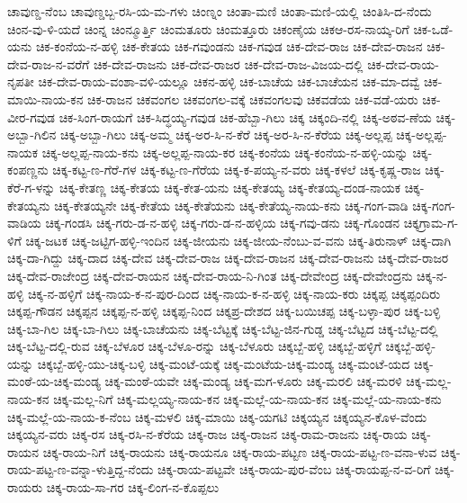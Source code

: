 ಚಾವುಣ್ಡ-ನೆಂಬ
ಚಾವುಣ್ಡಬ್ಬ-ರಸಿ-ಯ-ಮ-ಗಳು
ಚಿಂಣ್ನಂ
ಚಿಂತಾ-ಮಣಿ
ಚಿಂತಾ-ಮಣಿ-ಯಲ್ಲಿ
ಚಿಂತಿಸಿ-ದ-ನೆಂದು
ಚಿಂನ-ವು-ಳಿ-ಯದೆ
ಚಿಂನ್ನ
ಚಿಂನ್ಮೂರ್ತ್ತಿ
ಚಿಂಮತೂರು
ಚಿಂಮತ್ತೂರು
ಚಿಕಂಣೈಯ
ಚಿಕಆ-ರಸ-ನಾಯ್ಕ-ರಿಗೆ
ಚಿಕ-ಒಡೆ-ಯನು
ಚಿಕ-ಕಂನೆಯ-ನ-ಹಳ್ಳಿ
ಚಿಕ-ಕೇತಯ
ಚಿಕ-ಗವುಂಡನು
ಚಿಕ-ಗವುಡ
ಚಿಕ-ದೇವ-ರಾಜ
ಚಿಕ-ದೇವ-ರಾಜನ
ಚಿಕ-ದೇವ-ರಾಜ-ನ-ವರೆಗೆ
ಚಿಕ-ದೇವ-ರಾಜನು
ಚಿಕ-ದೇವ-ರಾಜರ
ಚಿಕ-ದೇವ-ರಾಜ-ವಿಜಯ-ದಲ್ಲಿ
ಚಿಕ-ದೇವ-ರಾಯ-ನೃಪತೀ
ಚಿಕ-ದೇವ-ರಾಯ-ವಂಶಾ-ವಳಿ-ಯಲ್ಲೂ
ಚಿಕನ-ಹಳ್ಳಿ
ಚಿಕ-ಬಾಚೆಯ
ಚಿಕ-ಬಾಚೆಯನ
ಚಿಕ-ಮಾ-ದವ್ವೆ
ಚಿಕ-ಮಾಯಿ-ನಾಯ-ಕನ
ಚಿಕ-ರಾಜನ
ಚಿಕವಂಗಲ
ಚಿಕವಂಗಲ-ವಕ್ಕೆ
ಚಿಕವಂಗಲವು
ಚಿಕವಡೆಯ
ಚಿಕ-ವಡೆ-ಯರು
ಚಿಕ-ವೀರ-ಗವುಡ
ಚಿಕ-ಸಿಂಗ-ರಾಯಗೆ
ಚಿಕ-ಸಿದ್ಧಯ್ಯ-ಗವುಡ
ಚಿಕ-ಹೆಬ್ಬಾ-ಗಿಲು
ಚಿಕ್ಕ
ಚಿಕ್ಕಂದಿ-ನಲ್ಲಿ
ಚಿಕ್ಕ-ಅಠವ-ಣೆಯ
ಚಿಕ್ಕ-ಅಬ್ಬಾ-ಗಿಲಿನ
ಚಿಕ್ಕ-ಅಬ್ಬಾ-ಗಿಲು
ಚಿಕ್ಕ-ಅಮ್ಮ
ಚಿಕ್ಕ-ಅರ-ಸಿ-ನ-ಕೆರೆ
ಚಿಕ್ಕ-ಅರ-ಸಿ-ನ-ಕೆರೆಯ
ಚಿಕ್ಕ-ಅಲ್ಲಪ್ಪ
ಚಿಕ್ಕ-ಅಲ್ಲಪ್ಪ-ನಾಯಕ
ಚಿಕ್ಕ-ಅಲ್ಲಪ್ಪ-ನಾಯ-ಕನು
ಚಿಕ್ಕ-ಅಲ್ಲಪ್ಪ-ನಾಯ-ಕರ
ಚಿಕ್ಕ-ಕಂನೆಯ
ಚಿಕ್ಕ-ಕಂನೆಯ-ನ-ಹಳ್ಳಿ-ಯನ್ನು
ಚಿಕ್ಕ-ಕಂಪಣ್ಣನು
ಚಿಕ್ಕ-ಕಟ್ಟ-ಣ-ಗೆರೆ-ಗಳ
ಚಿಕ್ಕ-ಕಟ್ಟ-ಣ-ಗೆರೆಯ
ಚಿಕ್ಕ-ಕ-ಪಯ್ಯ-ನ-ವರು
ಚಿಕ್ಕ-ಕಳಲೆ
ಚಿಕ್ಕ-ಕೃಷ್ಣ-ರಾಜ
ಚಿಕ್ಕ-ಕೆರೆ-ಗ-ಳನ್ನು
ಚಿಕ್ಕ-ಕೇತಣ್ಣ
ಚಿಕ್ಕ-ಕೇತಯ
ಚಿಕ್ಕ-ಕೇತ-ಯನು
ಚಿಕ್ಕ-ಕೇತಯ್ಯ
ಚಿಕ್ಕ-ಕೇತಯ್ಯ-ದಂಡ-ನಾಯಕ
ಚಿಕ್ಕ-ಕೇತಯ್ಯನು
ಚಿಕ್ಕ-ಕೇತಯ್ಯನೇ
ಚಿಕ್ಕ-ಕೇತೆಯ
ಚಿಕ್ಕ-ಕೇತೆಯನು
ಚಿಕ್ಕ-ಕೇತೆಯ್ಯ-ನಾಯ-ಕನು
ಚಿಕ್ಕ-ಗಂಗ-ವಾಡಿ
ಚಿಕ್ಕ-ಗಂಗ-ವಾಡಿಯ
ಚಿಕ್ಕ-ಗಂಡಸಿ
ಚಿಕ್ಕ-ಗರು-ಡ-ನ-ಹಳ್ಳಿ
ಚಿಕ್ಕ-ಗರು-ಡ-ನ-ಹಳ್ಳಿಯ
ಚಿಕ್ಕ-ಗವು-ಡನು
ಚಿಕ್ಕ-ಗೊಂಡನ
ಚಿಕ್ಕಗ್ರಾಮ-ಗ-ಳಿಗೆ
ಚಿಕ್ಕ-ಜಟಕ
ಚಿಕ್ಕ-ಜಟ್ಟಿಗ-ಹಳ್ಳಿ-ಇಂದಿನ
ಚಿಕ್ಕ-ಜೀಯನು
ಚಿಕ್ಕ-ಜೀಯ-ನೆಂಬು-ವ-ವನು
ಚಿಕ್ಕ-ತಿರುನಾಳ್
ಚಿಕ್ಕ-ದಾಗಿ
ಚಿಕ್ಕ-ದಾ-ಗಿದ್ದು
ಚಿಕ್ಕ-ದಾದ
ಚಿಕ್ಕ-ದೇವ
ಚಿಕ್ಕ-ದೇವ-ರಾಜ
ಚಿಕ್ಕ-ದೇವ-ರಾಜನ
ಚಿಕ್ಕ-ದೇವ-ರಾಜನು
ಚಿಕ್ಕ-ದೇವ-ರಾಜರ
ಚಿಕ್ಕ-ದೇವ-ರಾಜೇಂದ್ರ
ಚಿಕ್ಕ-ದೇವ-ರಾಯನ
ಚಿಕ್ಕ-ದೇವ-ರಾಯ-ನಿ-ಗಿಂತ
ಚಿಕ್ಕ-ದೇವೇಂದ್ರ
ಚಿಕ್ಕ-ದೇವೇಂದ್ರನು
ಚಿಕ್ಕ-ನ-ಹಳ್ಳಿ
ಚಿಕ್ಕ-ನ-ಹಳ್ಳಿಗೆ
ಚಿಕ್ಕ-ನಾಯ-ಕ-ನ-ಪುರ-ದಿಂದ
ಚಿಕ್ಕ-ನಾಯ-ಕ-ನ-ಹಳ್ಳಿ
ಚಿಕ್ಕ-ನಾಯ-ಕರು
ಚಿಕ್ಕಪ್ಪ
ಚಿಕ್ಕಪ್ಪಂದಿರು
ಚಿಕ್ಕಪ್ಪ-ಗೌಡನ
ಚಿಕ್ಕಪ್ಪನ
ಚಿಕ್ಕಪ್ಪ-ನ-ಹಳ್ಳಿ
ಚಿಕ್ಕಪ್ಪ-ನಿಂದ
ಚಿಕ್ಕಪ್ರ-ದೇಶದ
ಚಿಕ್ಕ-ಬಯಿಚಪ್ಪ
ಚಿಕ್ಕ-ಬಳ್ಳಾ-ಪುರ
ಚಿಕ್ಕ-ಬಳ್ಳಿ
ಚಿಕ್ಕ-ಬಾ-ಗಿಲ
ಚಿಕ್ಕ-ಬಾ-ಗಿಲು
ಚಿಕ್ಕ-ಬಾಚೆಯನು
ಚಿಕ್ಕ-ಬೆಟ್ಟಕ್ಕೆ
ಚಿಕ್ಕ-ಬೆಟ್ಟ-ಜಿನ-ಗುಡ್ಡ
ಚಿಕ್ಕ-ಬೆಟ್ಟದ
ಚಿಕ್ಕ-ಬೆಟ್ಟ-ದಲ್ಲಿ
ಚಿಕ್ಕ-ಬೆಟ್ಟ-ದಲ್ಲಿ-ರುವ
ಚಿಕ್ಕ-ಬೆಳೂರ
ಚಿಕ್ಕ-ಬೆಳೂ-ರನ್ನು
ಚಿಕ್ಕ-ಬೆಳೂರು
ಚಿಕ್ಕಬ್ಬೆ-ಹಳ್ಳಿ
ಚಿಕ್ಕಬ್ಬೆ-ಹಳ್ಳಿಗೆ
ಚಿಕ್ಕಬ್ಬೆ-ಹಳ್ಳಿ-ಯನ್ನು
ಚಿಕ್ಕಬ್ಬೆ-ಹಳ್ಳಿ-ಯು-ಚಿಕ್ಕ-ಬಳ್ಳಿ
ಚಿಕ್ಕ-ಮಂಟೆ-ಯಕ್ಕೆ
ಚಿಕ್ಕ-ಮಂಟೆಯ-ಚಿಕ್ಕ-ಮಂಡ್ಯ
ಚಿಕ್ಕ-ಮಂಟೆ-ಯದ
ಚಿಕ್ಕ-ಮಂಠೆ-ಯ-ಚಿಕ್ಕ-ಮಂಡ್ಯ
ಚಿಕ್ಕ-ಮಂಠೆ-ಯವೇ
ಚಿಕ್ಕ-ಮಂಡ್ಯ
ಚಿಕ್ಕ-ಮಗ-ಳೂರು
ಚಿಕ್ಕ-ಮರಲಿ
ಚಿಕ್ಕ-ಮರಳಿ
ಚಿಕ್ಕ-ಮಲ್ಲ-ನಾಯ-ಕನ
ಚಿಕ್ಕ-ಮಲ್ಲ-ನಿಗೆ
ಚಿಕ್ಕ-ಮಲ್ಲಯ್ಯ-ನಾಯ-ಕನ
ಚಿಕ್ಕ-ಮಲ್ಲೆ-ಯ-ನಾಯ-ಕನ
ಚಿಕ್ಕ-ಮಲ್ಲೆ-ಯ-ನಾಯ-ಕನು
ಚಿಕ್ಕ-ಮಲ್ಲೆ-ಯ-ನಾಯ-ಕ-ನೆಂಬ
ಚಿಕ್ಕ-ಮಳಲಿ
ಚಿಕ್ಕ-ಮಾಯಿ
ಚಿಕ್ಕ-ಯಗಟಿ
ಚಿಕ್ಕಯ್ಯನ
ಚಿಕ್ಕಯ್ಯನ-ಕೊಳ-ವೆಂದು
ಚಿಕ್ಕಯ್ಯನ-ವರು
ಚಿಕ್ಕ-ರಸ
ಚಿಕ್ಕ-ರಸಿ-ನ-ಕೆರೆಯ
ಚಿಕ್ಕ-ರಾಜ
ಚಿಕ್ಕ-ರಾಜನ
ಚಿಕ್ಕ-ರಾಮ-ರಾಜನು
ಚಿಕ್ಕ-ರಾಯ
ಚಿಕ್ಕ-ರಾಯನ
ಚಿಕ್ಕ-ರಾಯ-ನಿಗೆ
ಚಿಕ್ಕ-ರಾಯನು
ಚಿಕ್ಕ-ರಾಯನೂ
ಚಿಕ್ಕ-ರಾಯ-ಪಟ್ಟಣ
ಚಿಕ್ಕ-ರಾಯ-ಪಟ್ಟ-ಣ-ವನಾ-ಳುವ
ಚಿಕ್ಕ-ರಾಯ-ಪಟ್ಟ-ಣ-ವನ್ನಾ-ಳುತ್ತಿದ್ದ-ನೆಂದು
ಚಿಕ್ಕ-ರಾಯ-ಪಟ್ಟವೇ
ಚಿಕ್ಕ-ರಾಯ-ಪುರ-ವೆಂಬ
ಚಿಕ್ಕ-ರಾಯಪ್ಪ-ನ-ವ-ರಿಗೆ
ಚಿಕ್ಕ-ರಾಯರು
ಚಿಕ್ಕ-ರಾಯ-ಸಾ-ಗರ
ಚಿಕ್ಕ-ಲಿಂಗ-ನ-ಕೊಪ್ಪಲು

